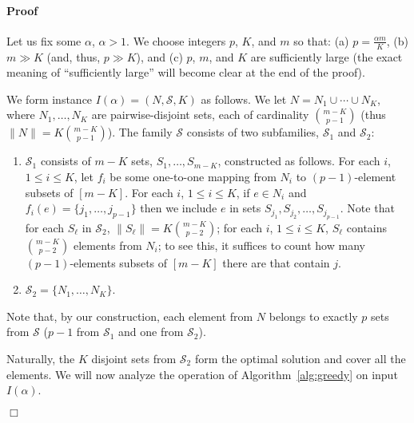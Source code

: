 \documentclass[11pt]{article}
\newenvironment{proof}{\paragraph{Proof}}{\hfill$\Box$\medskip}
\newcommand{\calS}{{{\mathcal{S}}}}
\begin{document}
\begin{proof}
  Let us fix some $\alpha$, $\alpha > 1$.  We choose integers $p$,
  $K$, and $m$ so that: (a) $p = \frac{\alpha m}{K}$, (b) $m \gg K$
  (and, thus, $p \gg K$), and (c) $p$, $m$, and $K$ are sufficiently
  large (the exact meaning of ``sufficiently large'' will become clear
  at the end of the proof). 

  We form instance $I(\alpha) = (N,\calS,K)$ as follows.
We let $N = N_1 \cup \cdots \cup N_K$, where $N_1, \ldots, N_K$ are
  pairwise-disjoint sets, each of cardinality ${m-K \choose p-1}$
  (thus $\|N\| = K{m-K \choose p-1}$).  The family $\calS$ consists of
  two subfamilies, $\calS_1$ and $\calS_2$:
  \begin{enumerate}
  \item $\calS_1$ consists of $m - K$ sets, $S_{1}, \ldots, S_{m-K}$,
    constructed as follows. For each $i$, $1 \leq i \leq K$, let $f_i$
    be some one-to-one mapping from $N_i$ to $(p-1)$-element subsets
    of $[m-K]$. For each $i$, $1 \leq i \leq K$, if $e \in N_i$ and
    $f_i(e) = \{j_1, \ldots, j_{p-1}\}$ then we include $e$ in sets
    $S_{j_1}, S_{j_2}, \ldots, S_{j_{p-1}}$.  Note that for each
    $S_\ell$ in $\calS_2$, $\|S_\ell\| = K { m - K \choose p-2 }$; for
    each $i$, $1 \leq i \leq K$, $S_\ell$ contains ${m - K \choose
      p-2}$ elements from $N_i$; to see this, it suffices to count how
    many $(p-1)$-elements subsets of $[m-K]$ there are that contain $j$.
   

  \item $\calS_2 = \{N_1, \ldots, N_K\}$.
  \end{enumerate}
Note that, by our construction, each element from $N$ belongs to
  exactly $p$ sets from $\calS$ ($p-1$ from $\calS_1$ and one from
  $\calS_2$).

  Naturally, the $K$ disjoint sets from $\calS_2$ form the optimal
  solution and cover all the elements.  We will now analyze the
  operation of Algorithm~\ref{alg:greedy} on input $I(\alpha)$.


\end{proof}
\end{document}
